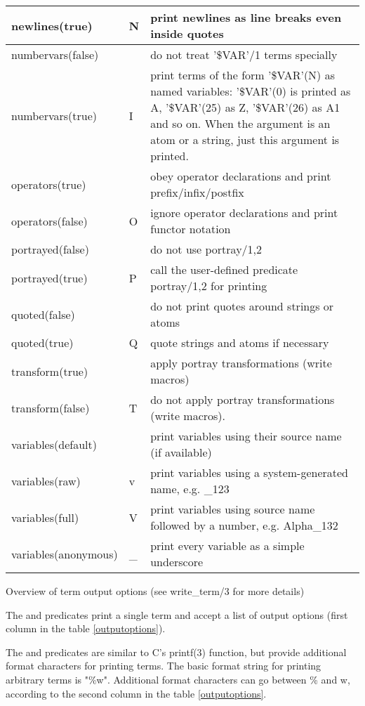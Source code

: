 \begin{center}
\begin{tabular}{|p{3.5cm}|p{1.5cm}|p{10cm}|}
\hline
newlines(true)		& N & print newlines as line breaks even inside quotes \\
\hline
numbervars(false)	&   & do not treat '\$VAR'/1 terms specially \\
\hline
numbervars(true)	& I & 
print terms of the form '\$VAR'(N) as named variables: 
'\$VAR'(0) is printed as A, '\$VAR'(25) as Z, '\$VAR'(26) as A1 and so on.
When the argument is an atom or a string, just this argument is printed. \\
\hline
operators(true)		&   & obey operator declarations and print prefix/infix/postfix \\
\hline
operators(false)	& O & ignore operator declarations and print functor notation \\
\hline
portrayed(false)	&   & do not use portray/1,2 \\
\hline
portrayed(true)		& P & call the user-defined predicate portray/1,2 for printing \\
\hline
quoted(false)		&   & do not print quotes around strings or atoms \\
\hline
quoted(true)		& Q & quote strings and atoms if necessary \\
\hline
transform(true)		&   & apply portray transformations (write macros) \\
\hline
transform(false)	& T & do not apply portray transformations (write macros). \\
\hline
variables(default)	&   & print variables using their source name (if available) \\
\hline
variables(raw)		& v & print variables using a system-generated name, e.g. _123 \\
\hline
variables(full)		& V & print variables using source name followed by a number, e.g. Alpha_132 \\
\hline
variables(anonymous)	& _ & print every variable as a simple underscore \\
\hline
\end{tabular}

Overview of term output options (see write_term/3 for more details)
\label{outputoptions}
\end{center}
The
 and
predicates print a single {\eclipse} term and accept a list of
output options (first column in the table \ref{outputoptions}).

The
 and
predicates are similar to C's printf(3) function, but provide
additional format characters for printing {\eclipse} terms.
The basic format string for printing arbitrary terms is "\%w".
Additional format characters can go between \% and w, according
to the second column in the table \ref{outputoptions}.

